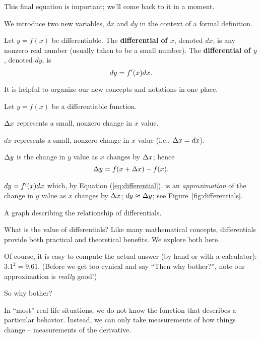 This final equation is important; we'll come back to it in a moment.

We introduce two new variables, $dx$ and $dy$ in the context of a formal definition. %

{Let $y=f(x)$ be differentiable. The \textbf{differential of $x$}, denoted $dx$, is any nonzero real number (usually taken to be a small number). The \textbf{differential of $y$}, denoted $dy$, is $$dy = f'(x)dx.$$
} %

It is helpful to organize our new concepts and notations in one place.

{Let $y = f(x)$ be a differentiable function. 
\ba
\item $\Delta x$ represents a small, nonzero change in $x$ value.
\item $dx$ represents a small, nonzero change in $x$ value (i.e., $\Delta x = dx$).
\item $\Delta y$ is the change in $y$ value as $x$ changes by $\Delta x$; hence $$\Delta y = f(x+\Delta x)-f(x).$$
\item $dy = f'(x)dx$ which, by Equation (\ref{eq:differential}), is an \textit{approximation} of the change in $y$ value as $x$ changes by $\Delta x$; $dy \approx \Delta y$; see Figure~\ref{fig:differentials}.
\ea
} %

\begin{marginfigure}[-3cm] %
\caption{A graph describing the relationship of differentials.}
\label{fig:differentials}
\end{marginfigure}

What is the value of differentials? Like many mathematical concepts, differentials provide both practical and theoretical benefits. We explore both here.


Of course, it is easy to compute the actual answer (by hand or with a calculator): $3.1^2 = 9.61.$ (Before we get too cynical and say ``Then why bother?'', note our approximation is \textit{really} good!)

So why bother?

In ``most'' real life situations, we do not know the function that describes a particular behavior. Instead, we can only take measurements of how things change -- measurements of the derivative.

